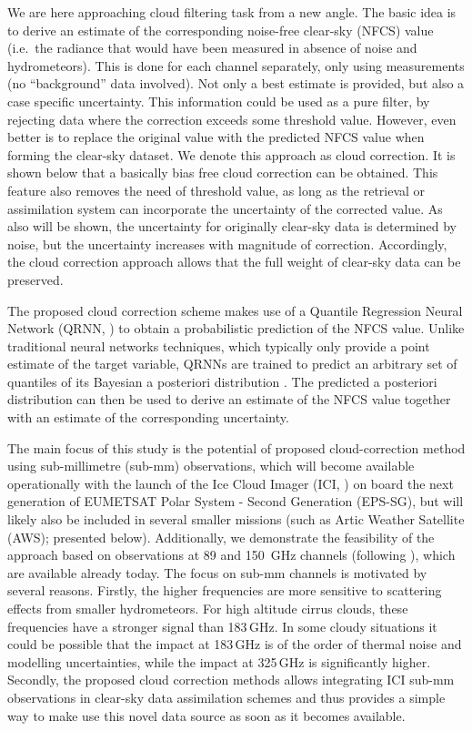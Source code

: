 \documentclass[amt, manuscript]{copernicus}
\begin{document}
We are here approaching cloud filtering task from a new angle. The basic idea
is to derive an estimate of the corresponding noise-free clear-sky (NFCS) value
(i.e.\ the radiance that would have been measured in absence of noise and
hydrometeors). This is done for each channel separately, only using
measurements (no ``background'' data involved). Not only a best estimate is
provided, but also a case specific uncertainty. This information could be used as a pure filter, by rejecting data where the correction exceeds some threshold value. However, even
better is to replace the original value with the predicted NFCS value when
forming the clear-sky dataset. We denote this approach as cloud correction. It
is shown below that a basically bias free cloud correction can be obtained.
This feature also removes the need of threshold value, as long as the retrieval or
assimilation system can incorporate the uncertainty of the corrected value. As
also will be shown, the uncertainty for originally clear-sky data is determined
by noise, but the uncertainty increases with magnitude of correction.
Accordingly, the cloud correction approach allows that the full weight of
clear-sky data can be preserved.

The proposed cloud correction scheme makes use of a Quantile Regression Neural
Network (QRNN, \citet{pfreundschuh:aneur:18}) to obtain a probabilistic prediction of the NFCS value. Unlike traditional neural networks techniques, which typically only provide a point
estimate of the target variable, QRNNs are trained to predict an arbitrary set
of quantiles of its Bayesian a posteriori distribution
\citep{pfreundschuh:aneur:18}. The predicted a posteriori distribution 
can then be used to derive an estimate of the NFCS value together with an estimate
of the corresponding uncertainty.

The main focus of this study is the potential of proposed cloud-correction
method using sub-millimetre (sub-mm) observations, which will become available
operationally with the launch of the Ice Cloud Imager (ICI,
\citet{eriksson:towar:20}) on board the next generation of EUMETSAT Polar System - Second Generation (EPS-SG), but will likely also be included in
several smaller missions (such as Artic Weather Satellite (AWS); presented
below). Additionally, we demonstrate the feasibility of the approach based on
observations at 89 and 150\ GHz channels (following
\citet{geer2015scatteringindex}), which are available already today. The focus
on sub-mm channels is motivated by several reasons. Firstly, the higher
frequencies are more sensitive to scattering effects from smaller
hydrometeors. For high altitude cirrus clouds, these frequencies have a stronger
signal than 183\,GHz. In some cloudy situations it could be possible that the
impact at 183\,GHz is of the order of thermal noise and modelling uncertainties,
while the impact at 325\,GHz is significantly higher. Secondly, the proposed
cloud correction methods allows integrating ICI sub-mm observations in
clear-sky data assimilation schemes and thus provides a simple
way to make use this novel data source as soon as it becomes available.
\end{document}
